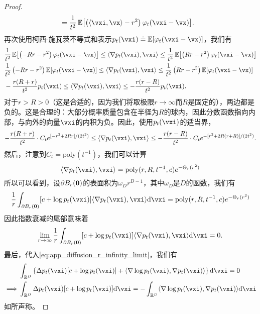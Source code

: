 \documentclass[../../book-main_zh.tex]{subfiles}
\begin{document}
\begin{proof}
\begin{align}
        &= \frac{1}{t^{2}}\Ex\rs{\bp{\ip{\vxi}{\vx} - r^{2}}\phi_{t}(\vxi - \vx)}.
    \end{align}
    再次使用柯西-施瓦茨不等式和表示\(p_{t}(\vxi) \doteq \Ex[\phi_{t}(\vxi - \vx)]\)，我们有
    \begin{align}
        &\frac{1}{t^{2}}\Ex\rs{\bp{-Rr - r^{2}}\phi_{t}(\vxi - \vx)} \leq \ip{\nabla p_{t}(\vxi)}{\vxi} \leq \frac{1}{t^{2}}\Ex\rs{\bp{Rr - r^{2}}\phi_{t}(\vxi - \vx)} \\
        &\frac{1}{t^{2}}\bp{-Rr - r^{2}}\Ex\rs{\phi_{t}(\vxi - \vx)} \leq \ip{\nabla p_{t}(\vxi)}{\vxi} \leq \frac{1}{t^{2}}\bp{Rr - r^{2}}\Ex\rs{\phi_{t}(\vxi - \vx)} \\
        &-\frac{r(R + r)}{t^{2}}p_{t}(\vxi) \leq \ip{\nabla p_{t}(\vxi)}{\vxi} \leq -\frac{r(r - R)}{t^{2}}p_{t}(\vxi).
    \end{align}
    对于\(r > R > 0\)（这是合适的，因为我们将取极限\(r \to \infty\)而\(R\)是固定的），两边都是负的。这是合理的：大部分概率质量包含在半径为\(R\)的球内，因此分数函数指向内部，与向外的向量\(\vxi\)的内积为负。因此，使用\(p_{t}(\vxi)\)的适当界，
    \begin{equation}
        -\frac{r(R + r)}{t^{2}}\cdot C_{t}e^{[-r^{2} + 2Rr]/(2t^{2})} \leq \ip{\nabla p_{t}(\vxi)}{\vxi} \leq -\frac{r(r - R)}{t^{2}}\cdot C_{t}e^{-[r^{2} + 2R(r + R)]/(2t^{2})}.
    \end{equation}
    然后，注意到\(C_{t} = \mathrm{poly}(t^{-1})\)，我们可以计算
    \begin{equation}
        [c + \log p_{t}(\vxi)]\ip{\nabla p_{t}(\vxi)}{\vxi} = \mathrm{poly}(r, R, t^{-1}, c)e^{-\Theta_{r}(r^{2})}
    \end{equation}
    所以可以看到，设\(\partial B_{r}(\bm{0})\)的表面积为\(\omega_{D} r^{D - 1}\)，其中\(\omega_{D}\)是\(D\)的函数，我们有
    \begin{equation}
        \frac{1}{r}\int_{\partial B_{r}(\vzero)}[c + \log p_{t}(\vxi)]\ip{\nabla p_{t}(\vxi)}{\vxi}\odif{\vxi} = \mathrm{poly}(r, R, t^{-1}, c)e^{-\Theta_{r}(r^{2})}
    \end{equation}
    因此指数衰减的尾部意味着
    \begin{equation}
        \lim_{r \to \infty}\frac{1}{r}\int_{\partial B_{r}(\vzero)}[c + \log p_{t}(\vxi)]\ip{\nabla p_{t}(\vxi)}{\vxi}\odif{\vxi} = 0.
    \end{equation}
    最后，代入\eqref{eq:app_diffusion_r_infinity_limit}，我们有
    \begin{align}
        &\int_{\R^{D}}\bc{\Delta p_{t}(\vxi)[c + \log p_{t}(\vxi)] + \ip{\nabla \log p_{t}(\vxi)}{\nabla p_{t}(\vxi)}}\odif{\vxi} = 0 \\
        \implies 
        &\int_{\R^{D}}\Delta p_{t}(\vxi)[c + \log p_{t}(\vxi)]\odif{\vxi} = -\int_{\R^{D}}\ip{\nabla \log p_{t}(\vxi)}{\nabla p_{t}(\vxi)}\odif{\vxi}
    \end{align}
    如所声称。
\end{proof}
\end{document}
